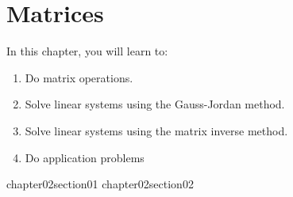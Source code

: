 \chapter{Matrices}

In this chapter, you will learn to:

\begin{enumerate}
    \item Do matrix operations.
    \item Solve linear systems using the Gauss-Jordan method.
    \item Solve linear systems using the matrix inverse method.
    \item Do application problems
\end{enumerate}


{chapter02section01}
{chapter02section02}
